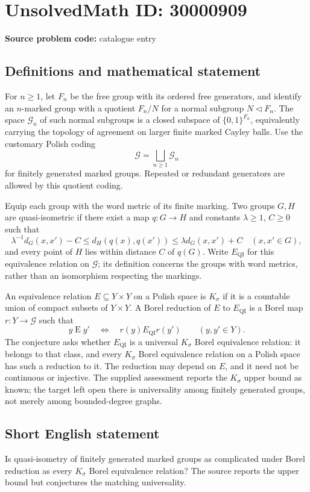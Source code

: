 \documentclass[11pt]{article}
\begin{document}
\section*{UnsolvedMath ID: 30000909}
\textbf{Source problem code:} catalogue entry
\subsection{Definitions and mathematical statement}
For \(n\geq1\), let \(F_n\) be the free group with its ordered free generators, and identify an \(n\)-marked group with a quotient \(F_n/N\) for a normal subgroup \(N\triangleleft F_n\). The space \(\mathcal G_n\) of such normal subgroups is a closed subspace of \(\{0,1\}^{F_n}\), equivalently carrying the topology of agreement on larger finite marked Cayley balls. Use the customary Polish coding
\[
\mathcal G=\bigsqcup_{n\geq1}\mathcal G_n
\]
for finitely generated marked groups. Repeated or redundant generators are allowed by this quotient coding.

Equip each group with the word metric of its finite marking. Two groups \(G,H\) are quasi-isometric if there exist a map \(q:G\to H\) and constants \(\lambda\geq1\), \(C\geq0\) such that
\[
\lambda^{-1}d_G(x,x')-C\leq d_H(q(x),q(x'))
\leq\lambda d_G(x,x')+C
\quad(x,x'\in G),
\]
and every point of \(H\) lies within distance \(C\) of \(q(G)\). Write \(E_{\mathrm{QI}}\) for this equivalence relation on \(\mathcal G\); its definition concerns the groups with word metrics, rather than an isomorphism respecting the markings.

An equivalence relation \(E\subseteq Y\times Y\) on a Polish space is \(K_\sigma\) if it is a countable union of compact subsets of \(Y\times Y\). A Borel reduction of \(E\) to \(E_{\mathrm{QI}}\) is a Borel map \(r:Y\to\mathcal G\) such that
\[
y\mathrel E y'\quad\Longleftrightarrow\quad
r(y)\mathrel{E_{\mathrm{QI}}}r(y')
\qquad(y,y'\in Y).
\]
The conjecture asks whether \(E_{\mathrm{QI}}\) is a universal \(K_\sigma\) Borel equivalence relation: it belongs to that class, and every \(K_\sigma\) Borel equivalence relation on a Polish space has such a reduction to it. The reduction may depend on \(E\), and it need not be continuous or injective. The supplied assessment reports the \(K_\sigma\) upper bound as known; the target left open there is universality among finitely generated groups, not merely among bounded-degree graphs.
\subsection{Short English statement}
Is quasi-isometry of finitely generated marked groups as complicated under Borel reduction as every \(K_\sigma\) Borel equivalence relation? The source reports the upper bound but conjectures the matching universality.
\end{document}
